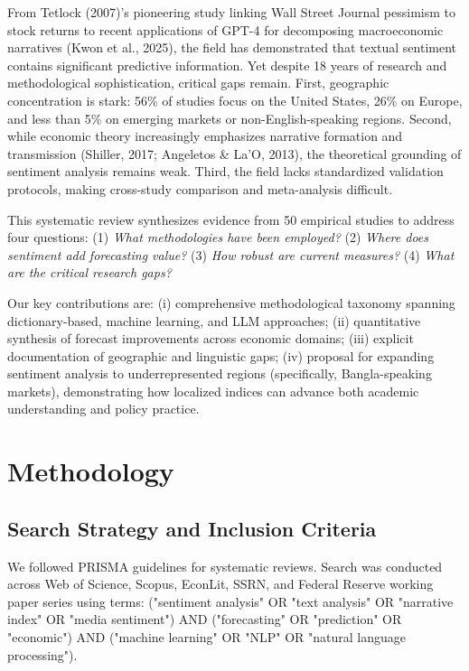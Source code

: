\documentclass[11pt]{article}
\begin{document}
From Tetlock (2007)'s pioneering study linking Wall Street Journal pessimism to stock returns to recent applications of GPT-4 for decomposing macroeconomic narratives (Kwon et al., 2025), the field has demonstrated that textual sentiment contains significant predictive information. Yet despite 18 years of research and methodological sophistication, critical gaps remain. First, geographic concentration is stark: 56\% of studies focus on the United States, 26\% on Europe, and less than 5\% on emerging markets or non-English-speaking regions. Second, while economic theory increasingly emphasizes narrative formation and transmission (Shiller, 2017; Angeletos \& La'O, 2013), the theoretical grounding of sentiment analysis remains weak. Third, the field lacks standardized validation protocols, making cross-study comparison and meta-analysis difficult.

This systematic review synthesizes evidence from 50 empirical studies to address four questions: (1) \textit{What methodologies have been employed?} (2) \textit{Where does sentiment add forecasting value?} (3) \textit{How robust are current measures?} (4) \textit{What are the critical research gaps?}

Our key contributions are: (i) comprehensive methodological taxonomy spanning dictionary-based, machine learning, and LLM approaches; (ii) quantitative synthesis of forecast improvements across economic domains; (iii) explicit documentation of geographic and linguistic gaps; (iv) proposal for expanding sentiment analysis to underrepresented regions (specifically, Bangla-speaking markets), demonstrating how localized indices can advance both academic understanding and policy practice.

\section{Methodology}

\subsection{Search Strategy and Inclusion Criteria}

We followed PRISMA guidelines for systematic reviews. Search was conducted across Web of Science, Scopus, EconLit, SSRN, and Federal Reserve working paper series using terms: ("sentiment analysis" OR "text analysis" OR "narrative index" OR "media sentiment") AND ("forecasting" OR "prediction" OR "economic") AND ("machine learning" OR "NLP" OR "natural language processing"). 
\end{document}
